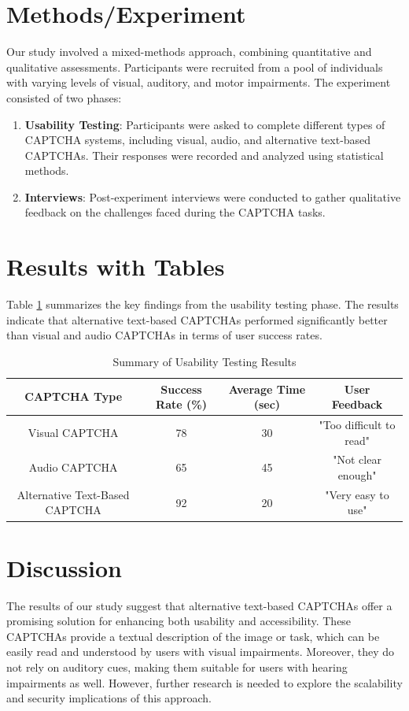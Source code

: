 \documentclass{article}
\begin{document}
\section{Methods/Experiment}
Our study involved a mixed-methods approach, combining quantitative and qualitative assessments. Participants were recruited from a pool of individuals with varying levels of visual, auditory, and motor impairments. The experiment consisted of two phases: 
\begin{enumerate}
    \item \textbf{Usability Testing}: Participants were asked to complete different types of CAPTCHA systems, including visual, audio, and alternative text-based CAPTCHAs. Their responses were recorded and analyzed using statistical methods.
    \item \textbf{Interviews}: Post-experiment interviews were conducted to gather qualitative feedback on the challenges faced during the CAPTCHA tasks.
\end{enumerate}

\section{Results with Tables}
Table \ref{table:results} summarizes the key findings from the usability testing phase. The results indicate that alternative text-based CAPTCHAs performed significantly better than visual and audio CAPTCHAs in terms of user success rates.

\begin{table}[ht]
    \centering
    \begin{tabular}{|c|c|c|c|}
        \hline
        \textbf{CAPTCHA Type} & \textbf{Success Rate (\%)} & \textbf{Average Time (sec)} & \textbf{User Feedback} \\
        \hline
        Visual CAPTCHA & 78 & 30 & "Too difficult to read" \\
        \hline
        Audio CAPTCHA & 65 & 45 & "Not clear enough" \\
        \hline
        Alternative Text-Based CAPTCHA & 92 & 20 & "Very easy to use" \\
        \hline
    \end{tabular}
    \caption{Summary of Usability Testing Results}
    \label{table:results}
\end{table}

\section{Discussion}
The results of our study suggest that alternative text-based CAPTCHAs offer a promising solution for enhancing both usability and accessibility. These CAPTCHAs provide a textual description of the image or task, which can be easily read and understood by users with visual impairments. Moreover, they do not rely on auditory cues, making them suitable for users with hearing impairments as well. However, further research is needed to explore the scalability and security implications of this approach.
\end{document}
